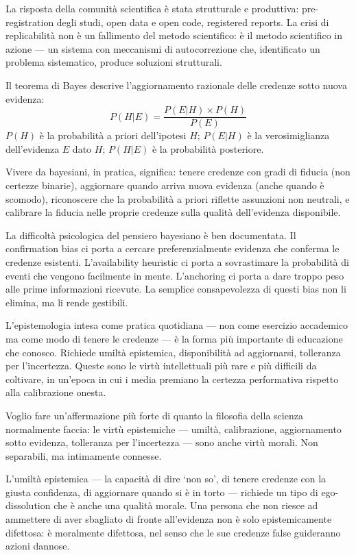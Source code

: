 \documentclass[12pt,a4paper,openany]{book}
\newcommand{\sezione}[1]{\vspace{1.2em}{\large\bfseries #1}\vspace{0.5em}\par}
\begin{document}
La risposta della comunità scientifica è stata strutturale e produttiva: pre-registration degli studi, open data e open code, registered reports. La crisi di replicabilità non è un fallimento del metodo scientifico: è il metodo scientifico in azione — un sistema con meccanismi di autocorrezione che, identificato un problema sistematico, produce soluzioni strutturali.

\sezione{Vivere da bayesiani}

Il teorema di Bayes descrive l'aggiornamento razionale delle credenze sotto nuova evidenza:
\[
P(H|E) = \frac{P(E|H) \times P(H)}{P(E)}
\]
$P(H)$ è la probabilità a priori dell'ipotesi $H$; $P(E|H)$ è la verosimiglianza dell'evidenza $E$ dato $H$; $P(H|E)$ è la probabilità posteriore.

Vivere da bayesiani, in pratica, significa: tenere credenze con gradi di fiducia (non certezze binarie), aggiornare quando arriva nuova evidenza (anche quando è scomodo), riconoscere che la probabilità a priori riflette assunzioni non neutrali, e calibrare la fiducia nelle proprie credenze sulla qualità dell'evidenza disponibile.

La difficoltà psicologica del pensiero bayesiano è ben documentata. Il confirmation bias ci porta a cercare preferenzialmente evidenza che conferma le credenze esistenti. L'availability heuristic ci porta a sovrastimare la probabilità di eventi che vengono facilmente in mente. L'anchoring ci porta a dare troppo peso alle prime informazioni ricevute. La semplice consapevolezza di questi bias non li elimina, ma li rende gestibili.

L'epistemologia intesa come pratica quotidiana — non come esercizio accademico ma come modo di tenere le credenze — è la forma più importante di educazione che conosco. Richiede umiltà epistemica, disponibilità ad aggiornarsi, tolleranza per l'incertezza. Queste sono le virtù intellettuali più rare e più difficili da coltivare, in un'epoca in cui i media premiano la certezza performativa rispetto alla calibrazione onesta.

\sezione{Le virtù epistemiche come virtù morali}

Voglio fare un'affermazione più forte di quanto la filosofia della scienza normalmente faccia: le virtù epistemiche --- umiltà, calibrazione, aggiornamento sotto evidenza, tolleranza per l'incertezza --- sono anche virtù morali. Non separabili, ma intimamente connesse.

L'umiltà epistemica --- la capacità di dire `non so', di tenere credenze con la giusta confidenza, di aggiornare quando si è in torto --- richiede un tipo di ego-dissolution che è anche una qualità morale. Una persona che non riesce ad ammettere di aver sbagliato di fronte all'evidenza non è solo epistemicamente difettosa: è moralmente difettosa, nel senso che le sue credenze false guideranno azioni dannose.
\end{document}
